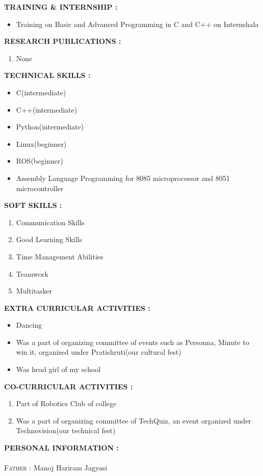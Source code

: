 \documentclass[12pt]{article}
\begin{document}
	\textbf{\textsc{TRAINING \& INTERNSHIP : }}
	\begin{itemize}
		\item Training on Basic and Advanced Programming in C and C++ on Internshala
	\end{itemize}
	\textbf{\textsc{RESEARCH PUBLICATIONS : }}
	\begin{enumerate}
		\item None
	\end{enumerate}
	\textbf{\textsc{TECHNICAL SKILLS : }}
	\begin{itemize}
		\item C(intermediate)
		\item C++(intermediate)
		\item Python(intermediate)
		\item Linux(beginner)
		\item ROS(beginner)
		\item Assembly Language Programming for 8085 microprocessor and 8051 microcontroller
	\end{itemize}
	\textbf{\textsc{SOFT SKILLS : }}
	\begin{enumerate}
		\item Communication Skills
		\item Good Learning Skills
		\item Time Management Abilities
		\item Teamwork
		\item Multitasker
	\end{enumerate}
	\textbf{\textsc{EXTRA CURRICULAR ACTIVITIES : }}
	\begin{itemize}
		\item Dancing
		\item Was a part of organizing committee of events such as Personna, Minute to win it, organized under Pratishruti(our cultural fest)
		\item Was head girl of my school
	\end{itemize}
	\textbf{\textsc{CO-CURRICULAR ACTIVITIES : }}
	\begin{enumerate}
		\item Part of Robotics Club of college
		\item Was a part of organizing committee of TechQuiz, an event organized under Technovision(our technical fest)
	\end{enumerate}
	\textbf{\textsc{PERSONAL INFORMATION : }}\\
	\\
	\textsc{Father : }Manoj Hariram Jagyasi\\
\end{document}
